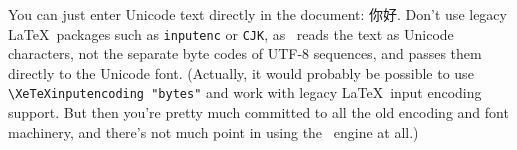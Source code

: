 You can just enter Unicode text directly in the document: 你好. Don't use legacy \LaTeX\ packages such as \verb|inputenc| or \verb|CJK|, as \XeTeX\ reads the text as Unicode characters, not the separate byte codes of UTF-8 sequences, and passes them directly to the Unicode font. (Actually, it would probably be possible to use \verb|\XeTeXinputencoding "bytes"| and work with legacy \LaTeX\ input encoding support. But then you're pretty much committed to all the old encoding and font machinery, and there's not much point in using the \XeTeX\ engine at all.)

\begin{comment}
\setromanfont{Times New Roman}

\subsection{A CJK environment}

\newenvironment{CJK}{\fontspec[Scale=0.9]{SimSun}}{}

\newcommand{\cjk}[1]{{\fontspec[Scale=0.9]{SimSun}#1}}

Rather than selecting a CJK font as the main document typeface, you might want to define a CJK environment for text fragments used in the midst of a document using a normal Roman font. This allows me to say \verb|\begin{CJK}東光\end{CJK}| to generate \begin{CJK}東光\end{CJK}, without putting the whole paragraph into the Far Eastern font. Or I could define a command that takes the CJK text as an argument, so that \verb|\cjk{北京}| produces \cjk{北京}. It's that easy! Such an environment can easily be set using the \cmd{newfamily} or \cmd{\fontspec}.

\begin{verbatim}
\newenvironment{CJK}{\fontspec[Scale=0.9]{SimSun}}{}
\newcommand{\cjk}[1]{{\fontspec[Scale=0.9]{SimSun}#1}}
\end{verbatim}
\end{comment}







